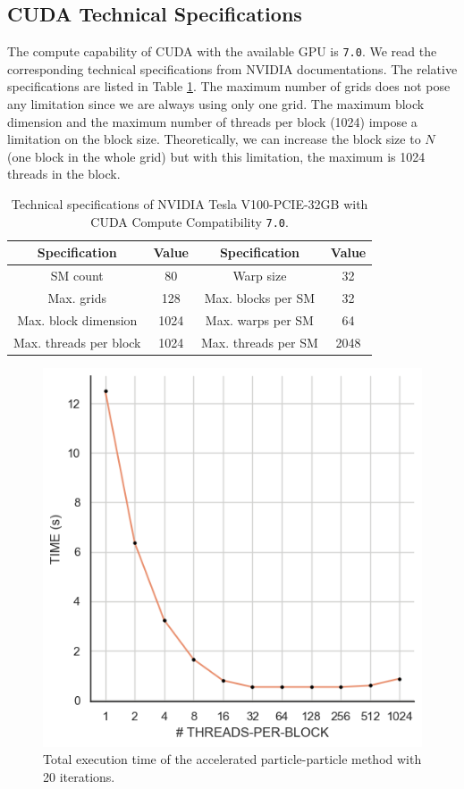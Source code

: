 \documentclass[10pt,journal,compsocconf]{IEEEtran}
\newcommand{\code}[1]{\texttt{#1}}
\begin{document}
\subsection{CUDA Technical Specifications}

The compute capability of CUDA with the available GPU is \code{7.0}. We read the corresponding technical specifications from NVIDIA documentations. The relative specifications are listed in Table \ref{tab:specs}. The maximum number of grids does not pose any limitation since we are always using only one grid. The maximum block dimension and the maximum number of threads per block (1024) impose a limitation on the block size. Theoretically, we can increase the block size to $N$ (one block in the whole grid) but with this limitation, the maximum is 1024 threads in the block.

\begin{table}[h]
    \centering
    \caption{Technical specifications of {NVIDIA Tesla V100-PCIE-32GB} with CUDA Compute Compatibility \code{7.0}.}
    \begin{tabular}{|c|c||c|c|}
        \hline
        Specification & Value & Specification & Value \\
        \hline
        SM count & 80 & Warp size & 32\\
        Max. grids & 128 & Max. blocks per SM & 32\\
        Max. block dimension & 1024 & Max. warps per SM & 64\\
        Max. threads per block & 1024 & Max. threads per SM & 2048\\
        \hline
    \end{tabular}
    \label{tab:specs}
\end{table}

\begin{figure}[ht]
  \centering
  \includegraphics[width=.35\textwidth]{img/threadsperblock.png}
  \caption{Total execution time of the accelerated particle-particle method with 20 iterations.}
  \label{fig:threadsperblock}
\end{figure}
\end{document}
